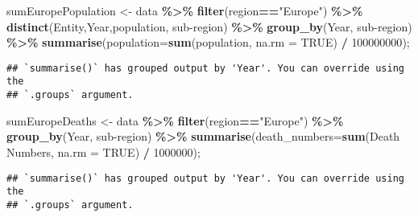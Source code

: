 \documentclass[
]{article}
\newenvironment{Shaded}{\begin{snugshade}}{\end{snugshade}}
\newcommand{\AttributeTok}[1]{\textcolor[rgb]{0.13,0.29,0.53}{#1}}
\newcommand{\ConstantTok}[1]{\textcolor[rgb]{0.56,0.35,0.01}{#1}}
\newcommand{\DecValTok}[1]{\textcolor[rgb]{0.00,0.00,0.81}{#1}}
\newcommand{\FunctionTok}[1]{\textcolor[rgb]{0.13,0.29,0.53}{\textbf{#1}}}
\newcommand{\NormalTok}[1]{#1}
\newcommand{\OtherTok}[1]{\textcolor[rgb]{0.56,0.35,0.01}{#1}}
\newcommand{\SpecialCharTok}[1]{\textcolor[rgb]{0.81,0.36,0.00}{\textbf{#1}}}
\newcommand{\StringTok}[1]{\textcolor[rgb]{0.31,0.60,0.02}{#1}}
\begin{document}
\begin{Shaded}
\begin{Highlighting}[]
\NormalTok{sumEuropePopulation }\OtherTok{\textless{}{-}}\NormalTok{ data }\SpecialCharTok{\%\textgreater{}\%} 
  \FunctionTok{filter}\NormalTok{(region}\SpecialCharTok{==}\StringTok{"Europe"}\NormalTok{) }\SpecialCharTok{\%\textgreater{}\%}
  \FunctionTok{distinct}\NormalTok{(Entity,Year,population, }\StringTok{\textasciigrave{}}\AttributeTok{sub{-}region}\StringTok{\textasciigrave{}}\NormalTok{) }\SpecialCharTok{\%\textgreater{}\%}
  \FunctionTok{group\_by}\NormalTok{(Year, }\StringTok{\textasciigrave{}}\AttributeTok{sub{-}region}\StringTok{\textasciigrave{}}\NormalTok{) }\SpecialCharTok{\%\textgreater{}\%}
  \FunctionTok{summarise}\NormalTok{(}\AttributeTok{population=}\FunctionTok{sum}\NormalTok{(population, }\AttributeTok{na.rm =} \ConstantTok{TRUE}\NormalTok{) }\SpecialCharTok{/} \DecValTok{100000000}\NormalTok{);}
\end{Highlighting}
\end{Shaded}

\begin{verbatim}
## `summarise()` has grouped output by 'Year'. You can override using the
## `.groups` argument.
\end{verbatim}

\begin{Shaded}
\begin{Highlighting}[]
\NormalTok{sumEuropeDeaths }\OtherTok{\textless{}{-}}\NormalTok{ data }\SpecialCharTok{\%\textgreater{}\%}
  \FunctionTok{filter}\NormalTok{(region}\SpecialCharTok{==}\StringTok{"Europe"}\NormalTok{) }\SpecialCharTok{\%\textgreater{}\%} 
  \FunctionTok{group\_by}\NormalTok{(Year, }\StringTok{\textasciigrave{}}\AttributeTok{sub{-}region}\StringTok{\textasciigrave{}}\NormalTok{) }\SpecialCharTok{\%\textgreater{}\%}
  \FunctionTok{summarise}\NormalTok{(}\AttributeTok{death\_numbers=}\FunctionTok{sum}\NormalTok{(}\StringTok{\textasciigrave{}}\AttributeTok{Death Numbers}\StringTok{\textasciigrave{}}\NormalTok{, }\AttributeTok{na.rm =} \ConstantTok{TRUE}\NormalTok{) }\SpecialCharTok{/} \DecValTok{1000000}\NormalTok{);}
\end{Highlighting}
\end{Shaded}

\begin{verbatim}
## `summarise()` has grouped output by 'Year'. You can override using the
## `.groups` argument.
\end{verbatim}
\end{document}
